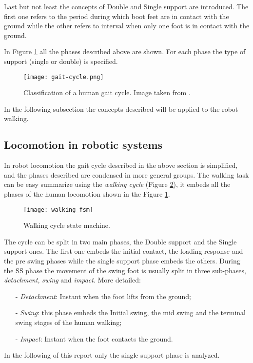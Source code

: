 Last but not least the concepts of Double and Single support are introduced. The first one refers to
the period during which boot feet are in contact with the ground while the other refers to interval when only one foot is in contact with the ground.
\par
In Figure \ref{fig:gait-cycle} all the phases described above are shown. For each phase the type of support (single or double) is specified.
\begin{figure}[!ht]
  \centering
  \texttt{[image: gait-cycle.png]}
  \caption{Classification of a human gait cycle. Image taken from \cite{Merker2015}. \label{fig:gait-cycle}}
\end{figure}
\par
In the following subsection the concepts described will be applied to the robot walking.
\subsection{Locomotion in robotic systems}
In robot locomotion the gait cycle described in the above section is simplified,
and the phases described are condensed in more general groups.
The walking task can be easy summarize using the \emph{walking cycle}
(Figure \ref{fig:walking_fsm}), it embeds all the phases of the human locomotion
shown in the Figure \ref{fig:gait-cycle}. 
\begin{figure}[!ht]
  \centering
  \texttt{[image: walking\_fsm]}
  \caption{Walking cycle state machine. \label{fig:walking_fsm}}
\end{figure}
\par
The cycle can be split in two main phases, the Double support and the Single support ones.
The first one embeds the initial contact, the loading response and the pre swing phases while the
single support phase embeds the others.
During the SS phase the movement of the swing foot 
is usually split in three sub-phases, \emph{detachment}, \emph{swing} and \emph{impact}.
More detailed:
\begin{itemize}
\item[-]\emph{Detachment}: Instant when the foot lifts from the ground;
\item[-]\emph{Swing}: this phase embeds the Initial swing, the mid swing and the terminal swing
  stages of the human walking;
\item[-]\emph{Impact}: Instant when the foot contacts the ground.
\end{itemize}
In the following of this report only the single support phase is analyzed.

